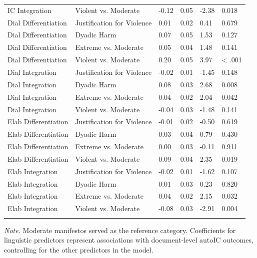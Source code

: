 \documentclass[
  english,
  man,floatsintext]{apa6}
\begin{document}
\begin{table}[tbp]
\begin{center}
\begin{threeparttable}
\begin{tabular}{llllll}
IC Integration & Violent vs. Moderate & -0.12 & 0.05 & -2.38 & 0.018\\
Dial Differentiation & Justification for Violence & 0.01 & 0.02 & 0.41 & 0.679\\
Dial Differentiation & Dyadic Harm & 0.07 & 0.05 & 1.53 & 0.127\\
Dial Differentiation & Extreme vs. Moderate & 0.05 & 0.04 & 1.48 & 0.141\\
Dial Differentiation & Violent vs. Moderate & 0.20 & 0.05 & 3.97 & < .001\\
Dial Integration & Justification for Violence & -0.02 & 0.01 & -1.45 & 0.148\\
Dial Integration & Dyadic Harm & 0.08 & 0.03 & 2.68 & 0.008\\
Dial Integration & Extreme vs. Moderate & 0.04 & 0.02 & 2.04 & 0.042\\
Dial Integration & Violent vs. Moderate & -0.04 & 0.03 & -1.48 & 0.141\\
Elab Differentiation & Justification for Violence & -0.01 & 0.02 & -0.50 & 0.619\\
Elab Differentiation & Dyadic Harm & 0.03 & 0.04 & 0.79 & 0.430\\
Elab Differentiation & Extreme vs. Moderate & 0.00 & 0.03 & -0.11 & 0.911\\
Elab Differentiation & Violent vs. Moderate & 0.09 & 0.04 & 2.35 & 0.019\\
Elab Integration & Justification for Violence & -0.02 & 0.01 & -1.62 & 0.107\\
Elab Integration & Dyadic Harm & 0.01 & 0.03 & 0.23 & 0.820\\
Elab Integration & Extreme vs. Moderate & 0.04 & 0.02 & 2.15 & 0.032\\
Elab Integration & Violent vs. Moderate & -0.08 & 0.03 & -2.91 & 0.004\\
\bottomrule
\addlinespace
\end{tabular}

\begin{tablenotes}[para]
\normalsize{\textit{Note.} Moderate manifestos served as the reference category. Coefficients for linguistic predictors represent associations with document-level autoIC outcomes, controlling for the other predictors in the model.}
\end{tablenotes}

\end{threeparttable}
\end{center}

\end{table}
\end{document}
